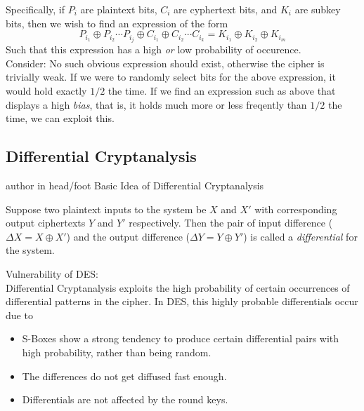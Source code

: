 \documentclass[9pt]{beamer}
\begin{document}
\begin{frame}
Specifically, if $P_{i}$ are plaintext bits, $C_{i}$ are cyphertext bits, and $K_{i}$ are subkey bits, then we wish to find an expression of the form
\[ P_{i_1} \oplus P_{i_2} \cdots P_{i_j} \oplus C_{i_1} \oplus C_{i_2} \cdots C_{i_k} = K_{i_1} \oplus K_{i_2} \oplus K_{i_m} \]
Such that this expression has a high \textit{or} low probability of occurence.\\
\vspace{5mm}
Consider: No such obvious expression should exist, otherwise the cipher is trivially weak. If we were to randomly select bits for the above expression, it would hold exactly $1/2$ the time. If we find an expression such as above that displays a high \textit{bias}, that is, it holds much more or less freqently than $1/2$ the time, we can exploit this.
\end{frame}


\subsection{Differential Cryptanalysis}
\begin{frame}
\begin{beamercolorbox}[ht=2.5ex,dp=1.125ex,center,rounded=true,shadow=true]{author in head/foot}
Basic Idea of Differential Cryptanalysis
\end{beamercolorbox}
\end{frame}

\begin{frame}
\begin{definition}[Differential]
Suppose two plaintext inputs to the system be $X$ and $X'$ with corresponding output ciphertexts $Y$ and $Y'$ respectively. Then the pair of input difference ($\Delta X = X \oplus X'$) and the output difference ($\Delta Y = Y \oplus Y'$) is called a {\it differential} for the system.
\end{definition}

Vulnerability of DES:\\
Differential Cryptanalysis exploits the high probability of certain occurrences of differential patterns in the cipher. In DES, this highly probable differentials occur due to
\begin{itemize}
\item{S-Boxes show a strong tendency to produce certain differential pairs with high probability, rather than being random.}
\item{The differences do not get diffused fast enough.}
\item{Differentials are not affected by the round keys.}
\end{itemize}
\end{frame}
\end{document}

